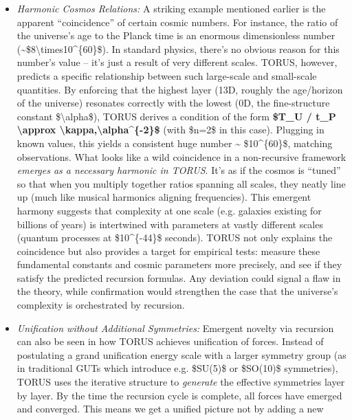 \begin{itemize}
\item
  \emph{Harmonic Cosmos Relations:} A striking example mentioned earlier
  is the apparent ``coincidence'' of certain cosmic numbers. For
  instance, the ratio of the universe's age to the Planck time is an
  enormous dimensionless number
  (\textasciitilde{}\$8\textbackslash{}times10\^{}\{60\}\$). In standard
  physics, there's no obvious reason for this number's value -- it's
  just a result of very different scales. TORUS, however, predicts a
  specific relationship between such large-scale and small-scale
  quantities. By enforcing that the highest layer (13D, roughly the
  age/horizon of the universe) resonates correctly with the lowest (0D,
  the fine-structure constant \$\textbackslash{}alpha\$), TORUS derives
  a condition of the form \textbf{\$T\_U / t\_P \textbackslash{}approx
  \textbackslash{}kappa,\textbackslash{}alpha\^{}\{-2\}\$} (with \$n=2\$
  in this case)​. Plugging in known values, this yields a consistent
  huge number \textasciitilde{} \$10\^{}\{60\}\$, matching observations.
  What looks like a wild coincidence in a non-recursive framework
  \emph{emerges as a necessary harmonic in TORUS}. It's as if the cosmos
  is ``tuned'' so that when you multiply together ratios spanning all
  scales, they neatly line up (much like musical harmonics aligning
  frequencies). This emergent harmony suggests that complexity at one
  scale (e.g. galaxies existing for billions of years) is intertwined
  with parameters at vastly different scales (quantum processes at
  \$10\^{}\{-44\}\$ seconds). TORUS not only explains the coincidence
  but also provides a target for empirical tests: measure these
  fundamental constants and cosmic parameters more precisely, and see if
  they satisfy the predicted recursion formulas​. Any deviation could
  signal a flaw in the theory, while confirmation would strengthen the
  case that the universe's complexity is orchestrated by recursion.
\item
  \emph{Unification without Additional Symmetries:} Emergent novelty via
  recursion can also be seen in how TORUS achieves unification of
  forces. Instead of postulating a grand unification energy scale with a
  larger symmetry group (as in traditional GUTs which introduce e.g.
  \$SU(5)\$ or \$SO(10)\$ symmetries), TORUS uses the iterative
  structure to \emph{generate} the effective symmetries layer by layer.
  By the time the recursion cycle is complete, all forces have emerged
  and converged. This means we get a unified picture not by adding a new

\end{itemize}
